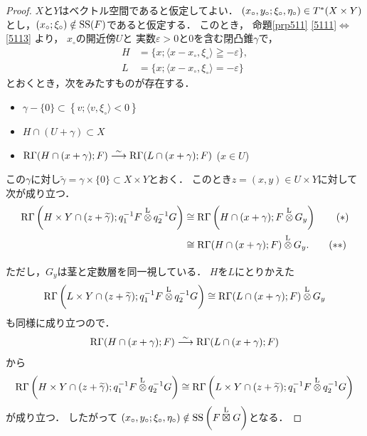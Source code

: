 \begin{proof}
    \(X\)と\(Y\)はベクトル空間であると仮定してよい．
    \(
        (x_{\circ},y_{\circ};\xi_{\circ},\eta_{\circ})
        \in \cotb[(X\times Y)]
    \)とし，\((x_\circ;\xi_\circ)\notin\muS(F)\)であると仮定する．
    このとき，
    命題\ref{prp511}
    \eqref{5111}\(\Leftrightarrow\)\eqref{5113}
    より，
    \(x_{\circ}\)の開近傍\(U\)と
    実数\(\varepsilon>0\)と\(0\)を含む閉凸錐\(\gamma\)で，
    \begin{align*}
        H&=\{x;\langle x-x_\circ,\xi_{\circ}\rangle\geqq-\varepsilon\}, \\
        L&=\{x;\langle x-x_\circ,\xi_{\circ}\rangle=-\varepsilon\}    
    \end{align*}
    とおくとき，次をみたすものが存在する．
    \begin{itemize}
        \item \(\gamma-\{0\}\subset\left\{v;\langle v,\xi_{\circ}\rangle<0\right\}\)
        \item \(H\cap(U+\gamma)\subset X\)
        \item \(\RG(H\cap(x+\gamma);F)\simar\RG(L\cap(x+\gamma);F)\) (\(x\in U\))
    \end{itemize}
    この\(\gamma\)に対し\(
        \widetilde{\gamma}=\gamma\times\{0\}\subset X\times Y
    \)とおく．
    このとき\(z=(x,y)\in U\times Y\)に対して次が成り立つ．
    \begin{align}
        \RG\left(
            H\times Y\cap (z+\widetilde{\gamma});
            q_{1}^{-1}F\lltens[]q_{2}^{-1}G
        \right)
        &\cong
        \RG\left(H\cap (x+\gamma);F\lltens[]G_{y}\right)\tag{\(\ast\)}\label{eq:541-1}\\
        &\cong
        \RG(H\cap (x+\gamma);F)\lltens[]G_{y}.\tag{\(\ast\ast\)}\label{eq:541-2}
    \end{align}
    ただし，\(G_y\)は茎と定数層を同一視している．
    \(H\)を\(L\)にとりかえた\[
        \RG\left(
        L\times Y\cap (z+\widetilde{\gamma});
        q_{1}^{-1}F\lltens[]q_{2}^{-1}G
        \right)
        \cong
        \RG(L\cap (x+\gamma);F)\lltens[]G_{y}
    \]
    も同様に成り立つので．
    \[
        \RG(H\cap(x+\gamma);F)
        \simar
        \RG(L\cap(x+\gamma);F) 
    \]から\[
        \RG\left(
            H\times Y\cap (z+\widetilde{\gamma});
            q_{1}^{-1}F\lltens[]q_{2}^{-1}G
        \right)
        \cong
        \RG\left(
            L\times Y\cap (z+\widetilde{\gamma});
            q_{1}^{-1}F\lltens[]q_{2}^{-1}G
        \right)
    \]が成り立つ．
    したがって
    \(
        (x_{\circ},y_{\circ};\xi_{\circ},\eta_{\circ})
        \notin
        \muS\left(F\lletens[] G\right)
    \)となる．
\end{proof}
